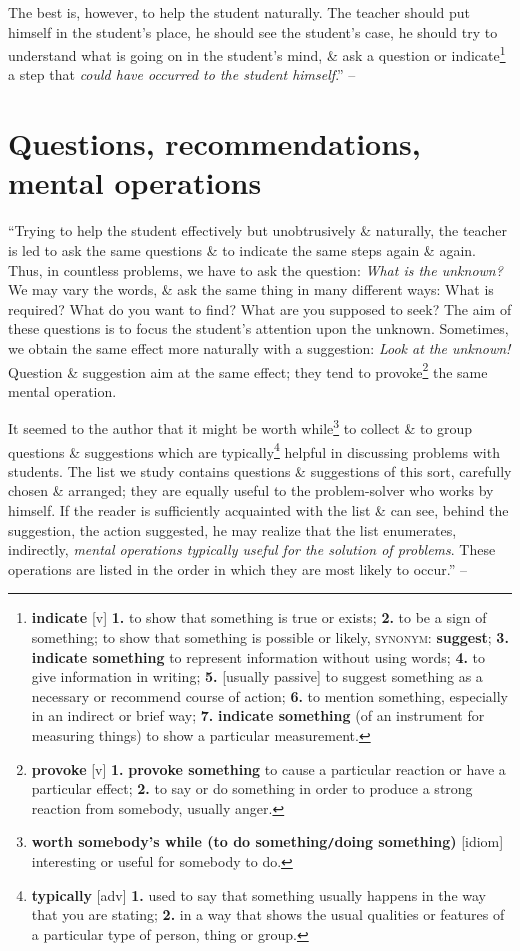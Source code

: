\documentclass[oneside]{book}
\numberwithin{equation}{section}
\begin{document}
The best is, however, to help the student naturally. The teacher should put himself in the student's place, he should see the student's case, he should try to understand what is going on in the student's mind, \& ask a question or indicate\footnote{\textbf{indicate} [v] \textbf{1.} to show that something is true or exists; \textbf{2.} to be a sign of something; to show that something is possible or likely, \textsc{synonym}: \textbf{suggest}; \textbf{3.} \textbf{indicate something} to represent information without using words; \textbf{4.} to give information in writing; \textbf{5.} [usually passive] to suggest something as a necessary or recommend course of action; \textbf{6.} to mention something, especially in an indirect or brief way; \textbf{7.} \textbf{indicate something} (of an instrument for measuring things) to show a particular measurement.} a step that \textit{could have occurred to the student himself}.'' -- \cite[p. 1]{Polya2014}

\section{Questions, recommendations, mental operations}
``Trying to help the student effectively but unobtrusively \& naturally, the teacher is led to ask the same questions \& to indicate the same steps again \& again. Thus, in countless problems, we have to ask the question: \textit{What is the unknown?} We may vary the words, \& ask the same thing in many different ways: What is required? What do you want to find? What are you supposed to seek? The aim of these questions is to focus the student's attention upon the unknown. Sometimes, we obtain the same effect more naturally with a suggestion: \textit{Look at the unknown!} Question \& suggestion aim at the same effect; they tend to provoke\footnote{\textbf{provoke} [v] \textbf{1.} \textbf{provoke something} to cause a particular reaction or have a particular effect; \textbf{2.} to say or do something in order to produce a strong reaction from somebody, usually anger.} the same mental operation.

It seemed to the author that it might be worth while\footnote{\textbf{worth somebody's while (to do something\texttt{/}doing something)} [idiom] interesting or useful for somebody to do.} to collect \& to group questions \& suggestions which are typically\footnote{\textbf{typically} [adv] \textbf{1.} used to say that something usually happens in the way that you are stating; \textbf{2.} in a way that shows the usual qualities or features of a particular type of person, thing or group.} helpful in discussing problems with students. The list we study contains questions \& suggestions of this sort, carefully chosen \& arranged; they are equally useful to the problem-solver who works by himself. If the reader is sufficiently acquainted with the list \& can see, behind the suggestion, the action suggested, he may realize that the list enumerates, indirectly, \textit{mental operations typically useful for the solution of problems}. These operations are listed in the order in which they are most likely to occur.'' -- \cite[pp. 1--2]{Polya2014}
\end{document}
